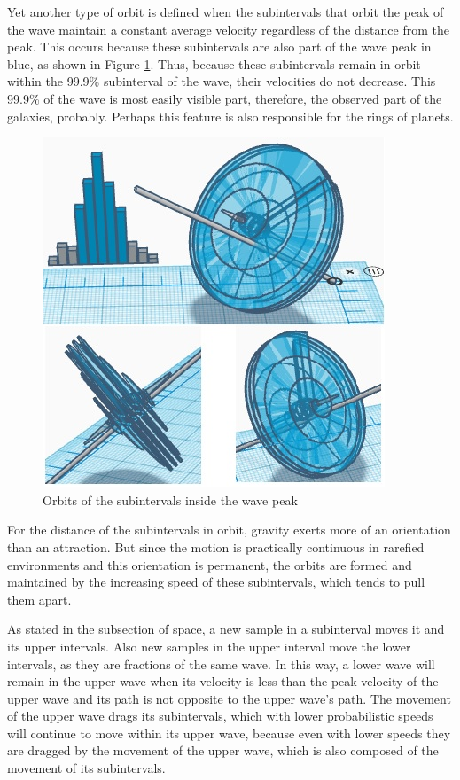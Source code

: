 Yet another type of orbit is defined when the subintervals that orbit the peak of the wave maintain a constant average velocity regardless of the distance from the peak. This occurs because these subintervals are also part of the wave peak in blue, as shown in Figure \ref{fig:consciousness_circular_orbit_system}. Thus, because these subintervals remain in orbit within the 99.9\% subinterval of the wave, their velocities do not decrease. This 99.9\% of the wave is most easily visible part, therefore, the observed part of the galaxies, probably. Perhaps this feature is also responsible for the rings of planets.
	\begin{figure}[H]
	\caption{Orbits of the subintervals inside the wave peak}
	\label{fig:consciousness_circular_orbit_system}
	\centering
	\includegraphics[scale=.9]{sections/images/consciousness_circular_orbit_system.jpg}
	\end{figure}

For the distance of the subintervals in orbit, gravity exerts more of an orientation than an attraction. But since the motion is practically continuous in rarefied environments and this orientation is permanent, the orbits are formed and maintained by the increasing speed of these subintervals, which tends to pull them apart.

As stated in the subsection of space, a new sample in a subinterval moves it and its upper intervals. Also new samples in the upper interval move the lower intervals, as they are fractions of the same wave. In this way, a lower wave will remain in the upper wave when its velocity is less than the peak velocity of the upper wave and its path is not opposite to the upper wave's path. The movement of the upper wave drags its subintervals, which with lower probabilistic speeds will continue to move within its upper wave, because even with lower speeds they are dragged by the movement of the upper wave, which is also composed of the movement of its subintervals.

